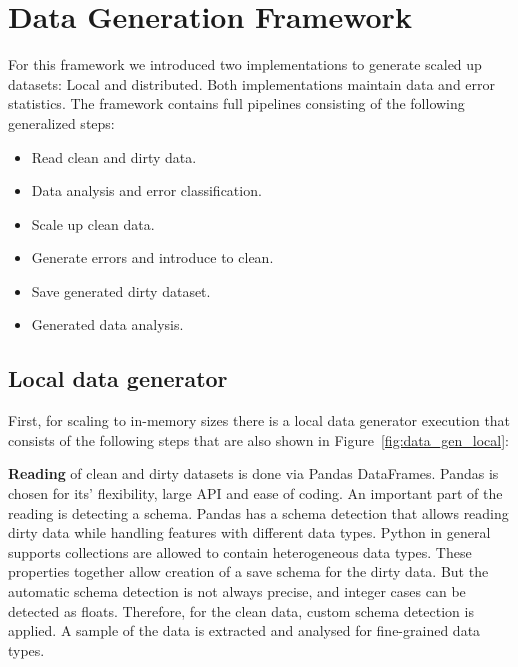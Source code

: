 \section{Data Generation Framework}
\label{sec:data_gen}
For this framework we introduced two implementations to generate scaled up datasets: Local and distributed.
Both implementations maintain data and error statistics. 
The framework contains full pipelines consisting of the following generalized steps:

\begin{itemize}
    \item Read clean and dirty data.
    \item Data analysis and error classification.
    \item Scale up clean data.
    \item Generate errors and introduce to clean.
    \item Save generated dirty dataset.
    \item Generated data analysis.
\end{itemize}

\subsection{Local data generator}
\label{sec:local_generator}


First, for scaling to in-memory sizes there is a local data generator execution that consists of the following steps that are also shown in Figure~\ref{fig:data_gen_local}:


\textbf{Reading} of clean and dirty datasets is done via Pandas DataFrames. 
Pandas is chosen for its' flexibility, large API and ease of coding. 
An important part of the reading is detecting a schema.
Pandas has a schema detection that allows reading dirty data while handling features with different data types. 
Python in general supports collections are allowed to contain heterogeneous data types. 
These properties together allow creation of a save schema for the dirty data.
But the automatic schema detection is not always precise, and integer cases can be detected as floats. 
Therefore, for the clean data, custom schema detection is applied. A sample of the data is extracted and analysed for fine-grained data types. 


